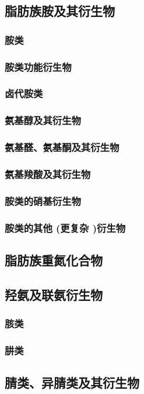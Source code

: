 \documentclass[UTF8]{../03-Chemistry}
\begin{document}
    \subsection{脂肪族胺及其衍生物}
        \subsubsection{胺类}
        \subsubsection{胺类功能衍生物}
        \subsubsection{卤代胺类}
        \subsubsection{氨基醇及其衍生物}
        \subsubsection{氨基醛、氨基酮及其衍生物}
        \subsubsection{氨基羧酸及其衍生物}
        \subsubsection{胺类的硝基衍生物}
        \subsubsection{胺类的其他 (更复杂 )衍生物}
    \subsection{脂肪族重氮化合物}
    \subsection{羟氨及联氨衍生物}
        \subsubsection{胲类}
        \subsubsection{肼类}
    \subsection{腈类、异腈类及其衍生物}
\end{document}

